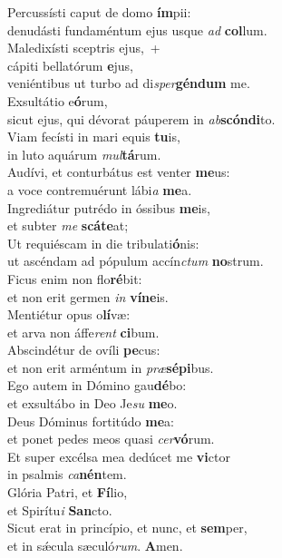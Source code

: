 \evenverse Percussísti caput de domo \textbf{ím}pii:~\*\\
\evenverse denudásti fundaméntum ejus usque \textit{ad} \textbf{col}lum.\\
\oddverse Maledixísti sceptris ejus,~+\\
\oddverse  cápiti bellatórum \textbf{e}jus,~\*\\
\oddverse veniéntibus ut turbo ad di\textit{sper}\textbf{gén}\textbf{dum} me.\\
\evenverse Exsultátio e\textbf{ó}rum,~\*\\
\evenverse sicut ejus, qui dévorat páuperem in \textit{ab}\textbf{scón}\textbf{di}to.\\
\oddverse Viam fecísti in mari equis \textbf{tu}is,~\*\\
\oddverse in luto aquárum \textit{mul}\textbf{tá}rum.\\
\evenverse Audívi, et conturbátus est venter \textbf{me}us:~\*\\
\evenverse a voce contremuérunt lábi\textit{a} \textbf{me}a.\\
\oddverse Ingrediátur putrédo in óssibus \textbf{me}is,~\*\\
\oddverse et subter \textit{me} \textbf{scá}\textbf{te}at;\\
\evenverse Ut requiéscam in die tribulati\textbf{ó}nis:~\*\\
\evenverse ut ascéndam ad pópulum accín\textit{ctum} \textbf{no}strum.\\
\oddverse Ficus enim non flo\textbf{ré}bit:~\*\\
\oddverse et non erit germen \textit{in} \textbf{ví}\textbf{ne}is.\\
\evenverse Mentiétur opus o\textbf{lí}væ:~\*\\
\evenverse et arva non áffe\textit{rent} \textbf{ci}bum.\\
\oddverse Abscindétur de ovíli \textbf{pe}cus:~\*\\
\oddverse et non erit arméntum in \textit{præ}\textbf{sé}\textbf{pi}bus.\\
\evenverse Ego autem in Dómino gau\textbf{dé}bo:~\*\\
\evenverse et exsultábo in Deo Je\textit{su} \textbf{me}o.\\
\oddverse Deus Dóminus fortitúdo \textbf{me}a:~\*\\
\oddverse et ponet pedes meos quasi \textit{cer}\textbf{vó}rum.\\
\evenverse Et super excélsa mea dedúcet me \textbf{vi}ctor~\*\\
\evenverse in psalmis \textit{ca}\textbf{nén}tem.\\
\oddverse Glória Patri, et \textbf{Fí}lio,~\*\\
\oddverse et Spirítu\textit{i} \textbf{San}cto.\\
\evenverse Sicut erat in princípio, et nunc, et \textbf{sem}per,~\*\\
\evenverse et in sǽcula sæculó\textit{rum}. \textbf{A}men.\\
